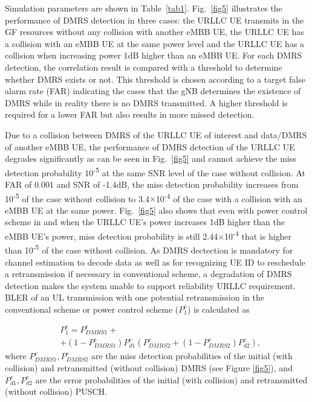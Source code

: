 \documentclass[conference]{IEEEtran}
\begin{document}
Simulation parameters are shown in Table~\ref{tab1}. Fig.~\ref{fig5} illustrates the performance of DMRS detection in three cases: the URLLC UE transmits in the GF resources without any collision with another eMBB UE, the URLLC UE has a collision with an eMBB UE at the same power level and the URLLC UE has a collision when increasing power 1dB higher than an eMBB UE. For each DMRS detection, the correlation result is compared with a threshold to determine whether DMRS exists or not. This threshold is chosen according to a target false alarm rate (FAR) indicating the cases that the gNB determines the existence of DMRS while in reality there is no DMRS transmitted. A higher threshold is required for a lower FAR but also results in more missed detection.

Due to a collision between DMRS of the URLLC UE of interest and data/DMRS of another eMBB UE, the performance of DMRS detection of the URLLC UE degrades significantly as can be seen in Fig.~\ref{fig5} and cannot achieve the miss detection probability 10\textsuperscript{-5} at the same SNR level of the case without collision. At FAR of 0.001 and SNR of -1.4dB, the miss detection probability increases from 10\textsuperscript{-5} of the case without collision to 3.4$\times$10\textsuperscript{-4} of the case with a collision with an eMBB UE at the same power. Fig.~\ref{fig5} also shows that even with power control scheme in \cite{b2} and \cite{b3} when the URLLC UE's power increases 1dB higher than the eMBB UE's power, miss detection probability is still 2.44$\times$10\textsuperscript{-4} that is higher than 10\textsuperscript{-5} of the case without collision. As DMRS dectection is mandatory for channel estimation to decode data as well as for recognizing UE ID to reschedule a retransmission if necessary in conventional scheme, a degradation of DMRS detection makes the system unable to support reliability URLLC requirement. BLER of an UL transmission with one potential retransmission in the conventional scheme or power control scheme ($ P^{e}_{1}$) is calculated as\useshortskip

\begin{equation}
\begin{split}
 &P^{e}_{1} = P^{e}_{DMRS1} + \\
        &+ (1-P^{e}_{DMRS1})P^{e}_{d1}(P^{e}_{DMRS2} + (1-P^{e}_{DMRS2})P^{e}_{d2}),\label{eq1}   
\end{split}
\end{equation}
where $ P^{e}_{DMRS1}, P^{e}_{DMRS2}$ are the miss detection probabilities of the initial (with collision) and retransmitted (without collision) DMRS (see Figure \ref{fig5}), and $P^{e}_{d1}, P^{e}_{d2}$ are the error probabilities of the initial (with collision) and retransmitted (without collision) PUSCH.
\end{document}
